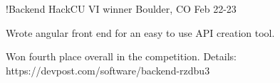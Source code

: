 

\begin{cventries}

\cventry
{!Backend} %
{HackCU VI winner} %
{Boulder, CO} %
{Feb 22-23} %
{
  \begin{cvitems} %
    \item {Wrote angular front end for an easy to use API creation tool.}
    \item {Won fourth place overall in the competition. Details: https://devpost.com/software/backend-rzdbu3}
    \end{cvitems}
}
\end{cventries}
